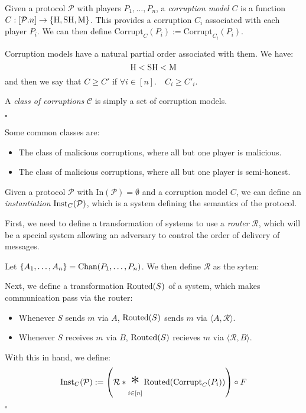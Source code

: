 \begin{definition}
Given a protocol $\mathcal{P}$ with players $P_1, \ldots, P_n$, a \emph{corruption model} $C$
is a function $C : [\mathcal{P}.n] \to \{\text{H}, \text{SH}, \text{M}\}$.
This provides a corruption $C_i$ associated with each player $P_i$.
We can then define $\text{Corrupt}_C(P_i) := \text{Corrupt}_{C_i}(P_i)$.

Corruption models have a natural partial order associated with them. 
We have:
$$
\text{H} < \text{SH} < \text{M}
$$
  and then we say that $C \geq C'$ if $\forall i \in [n]. \quad C_i \geq C'_i$.

A \emph{class of corruptions} $\mathcal{C}$ is simply a set of corruption models.

$\square$
\end{definition}

Some common classes are:
\begin{itemize}
  \item The class of malicious corruptions, where all but one player is malicious.
  \item The class of malicious corruptions, where all but one player is semi-honest.
\end{itemize}

\begin{definition}[Instantiation]
  Given a protocol $\mathcal{P}$ with $\text{In}(\mathcal{P}) = \emptyset$ and a corruption model $C$, we can
  define an \emph{instantiation} $\text{Inst}_C(\mathcal{P})$, which
  is a system defining the semantics of the protocol.

  First, we need to define a transformation of systems to use
  a \emph{router} $\mathcal{R}$, which will be a special system
  allowing an adversary to control the order of delivery of messages.

  Let $\{A_1, \ldots, A_n\} = \text{Chan}(P_1, \ldots, P_n)$.
  We then define $\mathcal{R}$ as the syten:

  Next, we define a transformation $\text{Routed}(S)$ of a system,
  which makes communication pass via the router:
  \begin{itemize}
    \item Whenever $S$ sends $m$ via $A$, $\text{Routed}(S)$ sends $m$ via $\langle A , \mathcal{R} \rangle$.
    \item Whenever $S$ receives $m$ via $B$, $\text{Routed}(S)$ recieves $m$ via $\langle \mathcal{R}, B \rangle$.
  \end{itemize}

With this in hand, we define:
$$
\tx{Inst}_C(\mathcal{P}) := \left(\mathcal{R} * \bigast_{i \in [n]} \tx{Routed}(\tx{Corrupt}_C(P_i))\right) \circ F
$$


$\square$
\end{definition}

